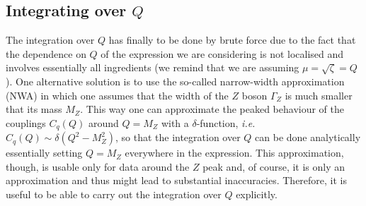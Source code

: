 \documentclass[10pt,a4paper]{article}
\begin{document}
\subsection{Integrating over $Q$}

The integration over $Q$ has finally to be done by brute force due to
the fact that the dependence on $Q$ of the expression we are
considering is not localised and involves essentially all ingredients
(we remind that we are assuming $\mu=\sqrt{\zeta}=Q$). One alternative
solution is to use the so-called narrow-width approximation (NWA) in
which one assumes that the width of the $Z$ boson $\Gamma_Z$ is much
smaller that its mass $M_Z$. This way one can approximate the peaked
behaviour of the couplings $C_q(Q)$ around $Q=M_Z$ with a
$\delta$-function, \textit{i.e.} $C_q(Q)\sim \delta(Q^2-M_Z^2)$, so
that the integration over $Q$ can be done analytically essentially
setting $Q=M_Z$ everywhere in the expression. This approximation,
though, is usable only for data around the $Z$ peak and, of course, it
is only an approximation and thus might lead to substantial
inaccuracies. Therefore, it is useful to be able to carry out the
integration over $Q$ explicitly.
\end{document}
